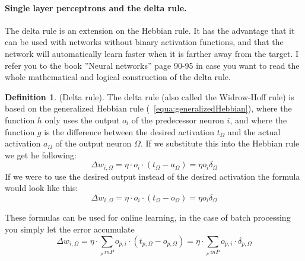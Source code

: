 \documentclass[pdftex,a4paper,12pt,twoside]{report}
\theoremstyle{plain} \newtheorem{theorem}{Theorem} \newtheorem{proposition}{Proposition} \newtheorem{lemma}{Lemma} \newtheorem*{corollary}{Corollary}
\theoremstyle{definition} \newtheorem{definition}{Definition} \newtheorem{conjecture}{Conjecture} \newtheorem*{example}{Example} \newtheorem{algorithm}{Algorithm}
\theoremstyle{remark} \newtheorem*{remark}{Remark} \newtheorem*{note}{Note} \newtheorem{case}{Case}
\begin{document}
\paragraph{Single layer perceptrons and the delta rule.}
The delta rule is an extension on the Hebbian rule. It has the advantage that it can be used with networks without binary activation functions, and that the network will automatically learn faster when it is farther away from the target. I refer you to the book ''Neural networks'' page 90-95 \citep{Kriesel2013} in case you want to read the whole mathematical and logical construction of the delta rule.
\begin{definition}
(Delta rule). The delta rule (also called the Widrow-Hoff rule) is based on the generalized Hebbian rule (~\ref{equa:generalizedHebbian}), where the function $h$ only uses the output $o_i$ of the predecessor neuron $i$, and where the function $g$ is the difference between the desired activation $t_\Omega$ and the actual activation $a_\Omega$ of the output neuron $\Omega$. If we substitute this into the Hebbian rule we get he following:
\begin{equation}
\Delta w_{i,\Omega} = \eta \cdot o_i \cdot (t_\Omega - a_\Omega) = \eta o_i \delta_\Omega
\end{equation}
\label{equa:deltaSLP}
If we were to use the desired output instead of the desired activation the formula would look like this:
\begin{equation}
\Delta w_{i,\Omega} = \eta \cdot o_i \cdot (t_\Omega - o_\Omega) = \eta o_i \delta_\Omega
\end{equation}
\end{definition}
These formulas can be used for online learning, in the case of batch processing you simply let the error accumulate
\begin{equation}
\Delta w_{i,\Omega} = \eta \cdot \sum_{_{p} \ in P} o_{p,i} \cdot (t_{p,\Omega} - o_{p,\Omega}) = \eta \cdot \sum_{_{p} \ in P} o_{p,i} \cdot \delta_{p,\Omega}
\end{equation}
\end{document}
